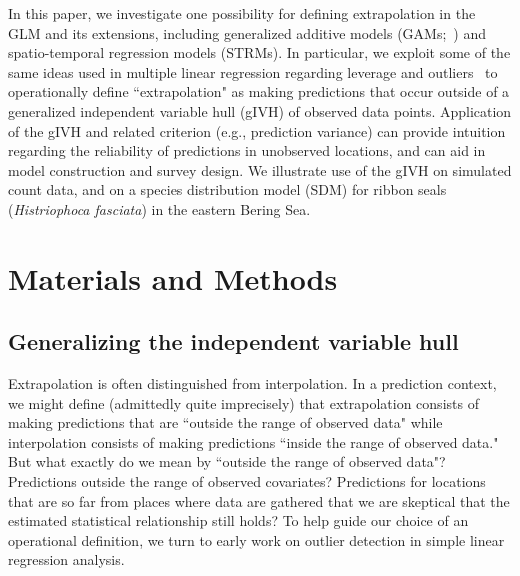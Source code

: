 \documentclass[10pt,letterpaper]{article}
\begin{document}
In this paper, we investigate one possibility for defining extrapolation in the GLM and its extensions, including generalized additive models (GAMs;~\cite{HastieTibshirani1999,Wood2006}) and spatio-temporal regression models (STRMs).  In particular, we exploit some of the same ideas used in multiple linear regression regarding leverage and outliers~\cite{Cook1979} to operationally define ``extrapolation" as making predictions that occur outside of a generalized independent variable hull (gIVH) of observed data points. Application of the gIVH and related criterion (e.g., prediction variance) can provide intuition regarding the reliability of predictions in unobserved locations, and can aid in model construction and survey design. We illustrate use of the gIVH on simulated count data, and on a species distribution model (SDM) for ribbon seals ({\it Histriophoca fasciata}) in the eastern Bering Sea.
\section*{Materials and Methods}
\subsection*{Generalizing the independent variable hull}

Extrapolation is often distinguished from interpolation.  In a prediction context, we might define (admittedly quite imprecisely) that extrapolation consists of making predictions that are ``outside the range of observed data" while interpolation consists of making predictions ``inside the range of observed data."  But what exactly do we mean by ``outside the range of observed data"?  Predictions outside the range of observed covariates?  Predictions for locations that are so far from places where data are gathered that we are skeptical that the estimated statistical relationship still holds? To help guide our choice of an operational definition, we turn to early work on outlier detection in simple linear regression analysis.
\end{document}
